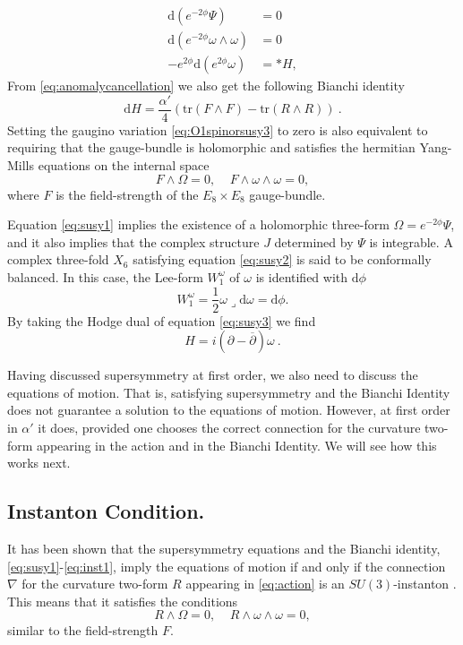 \documentclass[12pt,a4paper]{article}
\def\bar#1{\overline{#1}}
\let\p=\partial
\def\a{\alpha'}
\def\d{\textrm{d}}
\def\tr{\textrm{tr}}
\theoremstyle{definition}
\begin{document}
\begin{align}
\label{eq:susy1}
\d(e^{-2\phi}\Psi)&=0\\
\label{eq:susy2}
\d(e^{-2\phi}\omega\wedge\omega)&=0\\
\label{eq:susy3}
-e^{2\phi}\d(e^{2\phi}\omega)&=*H,
\end{align}
From \eqref{eq:anomalycancellation} we also get the following Bianchi identity
\begin{equation}
\d H=\frac{\a}{4}(\tr (F\wedge F)-\tr (R\wedge R))\:.
\end{equation}
Setting the gaugino variation \eqref{eq:O1spinorsusy3} to zero is also equivalent to requiring that the gauge-bundle is holomorphic and satisfies the hermitian Yang-Mills equations on the internal space
\begin{equation}
\label{eq:inst1}
F\wedge\Omega=0,\;\;\;\; F\wedge\omega\wedge\omega=0,
\end{equation}
where $F$ is the field-strength of the $E_8{\times}E_8$ gauge-bundle.

Equation \eqref{eq:susy1} implies the existence of a holomorphic three-form $\Omega=e^{-2\phi}\Psi$, and it also implies that the complex structure $J$ determined by $\Psi$ is integrable.
A complex three-fold $X_6$ satisfying equation \eqref{eq:susy2} is said to be conformally balanced. In this case, the Lee-form $W_1^\omega$ of $\omega$ is identified with $\d\phi$
\begin{equation}
W_1^\omega=\frac{1}{2}\omega\lrcorner\d\omega=\d\phi.
\end{equation}
By taking the Hodge dual of equation \eqref{eq:susy3} we find~\citep{Strominger:1986uh} 
\begin{equation}
\label{eq:flux2}
H=i(\p-\bar\p)\omega\:.
\end{equation}


Having discussed supersymmetry at first order, we also need to discuss the equations of motion. That is, satisfying supersymmetry and the Bianchi Identity does not guarantee a solution to the equations of motion. However, at first order in $\a$ it does, provided one chooses the correct connection for the curvature two-form appearing in the action and in the Bianchi Identity. We will see how this works next.

\subsection{Instanton Condition.}
It has been shown that the supersymmetry equations and the Bianchi identity, \eqref{eq:susy1}-\eqref{eq:inst1}, imply the equations of motion if and only if the connection $\nabla$ for the curvature two-form $R$ appearing in \eqref{eq:action} is an $SU(3)$-instanton \cite{Ivanov:2009rh, Martelli:2010jx}. This means that it satisfies the conditions
\begin{equation}
\label{eq:inst2}
R\wedge\Omega=0,\;\;\;\;R\wedge\omega\wedge\omega=0,
\end{equation}
similar to the field-strength $F$. 
\end{document}
